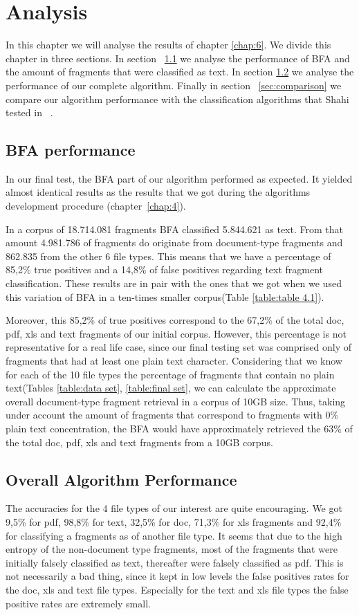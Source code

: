 \chapter{Analysis}
In this chapter we will analyse the results of chapter \ref{chap:6}. We divide this chapter in three sections. In section ~\ref{sec:7.1} we analyse the performance of BFA and the amount of fragments that were classified as text. In section  \ref{sec:7.2} we analyse the performance of our complete algorithm. Finally in section  ~\ref{sec:comparison} we compare our algorithm performance with the classification algorithms that Shahi tested in ~\cite{Ashim}.

\section{BFA performance}\label{sec:7.1}
In our final test, the BFA part of our algorithm performed as expected. It yielded almost identical results as the results that we got during the algorithms development procedure (chapter~\ref{chap:4}).

In a corpus of 18.714.081 fragments BFA classified 5.844.621 as text. From that amount 4.981.786 of fragments do originate from document-type fragments and 862.835 from the other 6 file types. This means that we have a percentage of 85,2\% true positives and a 14,8\% of false positives regarding text fragment classification. These results are in pair with the ones that we got when we used this variation of BFA in a ten-times smaller corpus(Table \ref{table:table 4.1}).

Moreover, this 85,2\% of true positives correspond to the 67,2\% of the total doc, pdf, xls and text fragments of our initial corpus. However, this percentage is not representative for a real life case, since our final testing set was comprised only of fragments that had at least one plain text character. Considering that we know for each of the 10 file types the percentage of fragments that contain no plain text(Tables \ref{table:data set}, \ref{table:final set}, we can calculate the approximate overall document-type fragment retrieval in a corpus of 10GB size. Thus, taking under account the amount of fragments that correspond to fragments with 0\% plain text concentration, the BFA would have approximately retrieved the 63\% of the total doc, pdf, xls and text fragments from a 10GB corpus.

\section{Overall Algorithm Performance}\label{sec:7.2}
The accuracies for the 4 file types of our interest are quite encouraging. We got 9,5\% for pdf, 98,8\% for text, 32,5\% for doc, 71,3\% for xls fragments and 92,4\% for classifying a fragments as of another file type. It seems that due to the high entropy of the non-document type fragments, most of the fragments that were initially falsely classified as text, thereafter were falsely classified as pdf. This is not necessarily a bad thing, since it kept in low levels the false positives rates for the doc, xls and text file types. Especially for the text and xls file types the false positive rates are extremely small.

